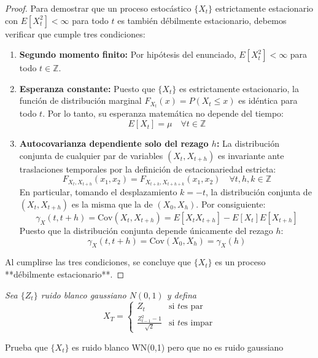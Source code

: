 \documentclass[11pt,letterpaper]{article}
\begin{document}
\begin{proof}
Para demostrar que un proceso estocástico $\{X_t\}$ estrictamente estacionario con $E[X_t^2] < \infty$ para todo $t$ es también débilmente estacionario, debemos verificar que cumple tres condiciones:

\begin{enumerate}
    \item \textbf{Segundo momento finito:}
    Por hipótesis del enunciado, $E[X_t^2] < \infty$ para todo $t \in \mathbb{Z}$.

    \item \textbf{Esperanza constante:}
    Puesto que $\{X_t\}$ es estrictamente estacionario, la función de distribución marginal $F_{X_t}(x) = P(X_t \le x)$ es idéntica para todo $t$. Por lo tanto, su esperanza matemática no depende del tiempo:
    \[
    E[X_t] = \mu \quad \forall t \in \mathbb{Z}
    \]

    \item \textbf{Autocovarianza dependiente solo del rezago $h$:}
    La distribución conjunta de cualquier par de variables $(X_t, X_{t+h})$ es invariante ante traslaciones temporales por la definición de estacionariedad estricta:
    \[
    F_{X_t, X_{t+h}}(x_1, x_2) = F_{X_{t+k}, X_{t+h+k}}(x_1, x_2) \quad \forall t, h, k \in \mathbb{Z}
    \]
    En particular, tomando el desplazamiento $k = -t$, la distribución conjunta de $(X_t, X_{t+h})$ es la misma que la de $(X_0, X_h)$. Por consiguiente:
    \[
    \gamma_X(t, t+h) = \text{Cov}(X_t, X_{t+h}) = E[X_t X_{t+h}] - E[X_t]E[X_{t+h}]
    \]
    Puesto que la distribución conjunta depende únicamente del rezago $h$:
    \[
    \gamma_X(t, t+h) = \text{Cov}(X_0, X_h) = \gamma_X(h)
    \]
\end{enumerate}

Al cumplirse las tres condiciones, se concluye que $\{X_t\}$ es un proceso **débilmente estacionario**. 
\end{proof}
\begin{tcolorbox}[
	title = \textcolor{black}{\textcolor{white}{Problema 2}},]
\textit{Sea $\{Z_t\}$ ruido blanco gaussiano $N(0,1)$ y defina 
\[
X_T = 
\begin{cases} 
Z_t& \text{si } t \text{es par} \\
\frac{Z_{t-1}^2-1}{\sqrt{2}} & \text{si } t \text{es impar}  
\end{cases}
\]}
\end{tcolorbox}
Prueba que $\{X_t\}$ es ruido blanco WN(0,1) pero que no es ruido gaussiano
\end{document}

